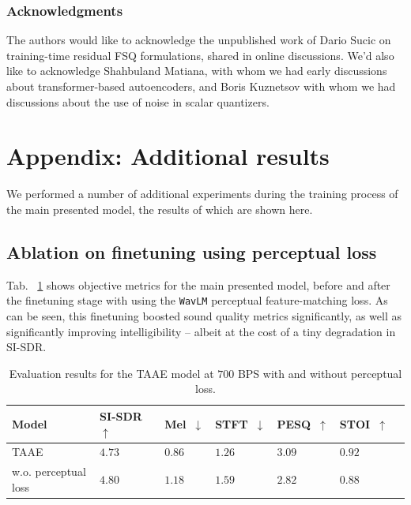 \documentclass{article} %
\begin{document}
\subsubsection*{Acknowledgments}
The authors would like to acknowledge the unpublished work of Dario Sucic on training-time residual FSQ formulations, shared in online discussions. We'd also like to acknowledge Shahbuland Matiana, with whom we had early discussions about transformer-based autoencoders, and Boris Kuznetsov with whom we had discussions about the use of noise in scalar quantizers.




\newpage
\appendix

\section{Appendix: Additional results}

We performed a number of additional experiments during the training process of the main presented model, the results of which are shown here.

\subsection{Ablation on finetuning using perceptual loss}
\label{app:perc_ablation}
Tab. ~\ref{tab:taae_perceptual_loss} shows objective metrics for the main presented model, before and after the finetuning stage with using the \texttt{WavLM} perceptual feature-matching loss. As can be seen, this finetuning boosted sound quality metrics significantly, as well as significantly improving intelligibility \--- albeit at the cost of a tiny degradation in SI-SDR.

\begin{table}[h]
\centering
\scriptsize
\begin{tabularx}{0.7\textwidth}{
    >{\raggedright\arraybackslash}m{2cm} %
    >{\centering\arraybackslash}X %
    >{\centering\arraybackslash}X %
    >{\centering\arraybackslash}X %
    >{\centering\arraybackslash}X %
    >{\centering\arraybackslash}X %
    >{\centering\arraybackslash}X %
}
\toprule
\textbf{Model} & \textbf{SI-SDR~$\uparrow$} & \textbf{Mel~$\downarrow$} & \textbf{STFT~$\downarrow$} & \textbf{PESQ~$\uparrow$} & \textbf{STOI~$\uparrow$} \\
\midrule
TAAE           & $4.73$ & $0.86$ & $1.26$ & $3.09$ & $0.92$ \\
w.o. perceptual loss                             & $4.80$ & $1.18$ & $1.59$ & $2.82$ & $0.88$ \\
\bottomrule
\end{tabularx}
\caption{Evaluation results for the TAAE model at $700$ BPS with and without perceptual loss.}
\vspace{-2mm}
\label{tab:taae_perceptual_loss}
\end{table}
\end{document}
